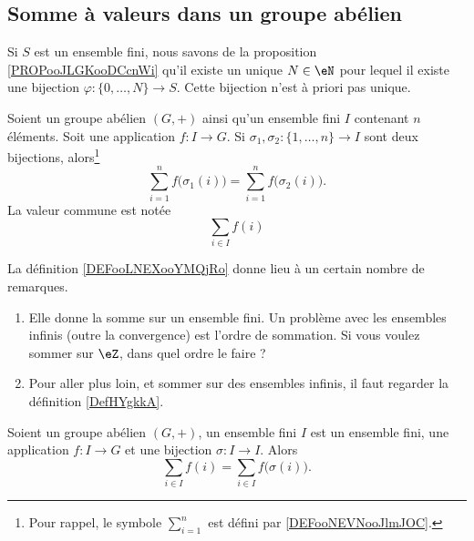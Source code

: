 \subsection{Somme à valeurs dans un groupe abélien}

Si \( S\) est un ensemble fini, nous savons de la proposition \ref{PROPooJLGKooDCcnWi} qu'il existe un unique \( N\in \eN\) pour lequel il existe une bijection \( \varphi\colon \{ 0,\ldots, N \}\to S\). Cette bijection n'est à priori pas unique.

\begin{lemmaDef}       \label{DEFooLNEXooYMQjRo}
    Soient un groupe abélien \( (G,+)\) ainsi qu'un ensemble fini \( I\) contenant \( n\) éléments. Soit une application \( f\colon I\to G \). Si \( \sigma_1,\sigma_2\colon \{1,\ldots, n \}\to I\) sont deux bijections, alors\footnote{Pour rappel, le symbole \( \sum_{i=1}^n\) est défini par \ref{DEFooNEVNooJlmJOC}.}
    \begin{equation}
        \sum_{i=1}^nf\big( \sigma_1(i) \big)=\sum_{i=1}^nf\big( \sigma_2(i) \big).
    \end{equation}
    La valeur commune est notée
    \begin{equation}
        \sum_{i\in I}f(i)
    \end{equation}
\end{lemmaDef}

La définition \ref{DEFooLNEXooYMQjRo} donne lieu à un certain nombre de remarques.
\begin{enumerate}
    \item
        Elle donne la somme sur un ensemble fini. Un problème avec les ensembles infinis (outre la convergence) est l'ordre de sommation. Si vous voulez sommer sur \( \eZ\), dans quel ordre le faire ?
    \item
        Pour aller plus loin, et sommer sur des ensembles infinis, il faut regarder la définition \ref{DefHYgkkA}. 
\end{enumerate}

\begin{proposition}     \label{PROPooJBQVooNqWErk}
    Soient un groupe abélien \( (G,+)\), un ensemble fini \( I\) est un ensemble fini, une application \( f\colon I\to G\) et une bijection \( \sigma\colon I\to I\). Alors
    \begin{equation}
        \sum_{i\in I}f(i)=\sum_{i\in I}f\big( \sigma(i) \big).
    \end{equation}
\end{proposition}

